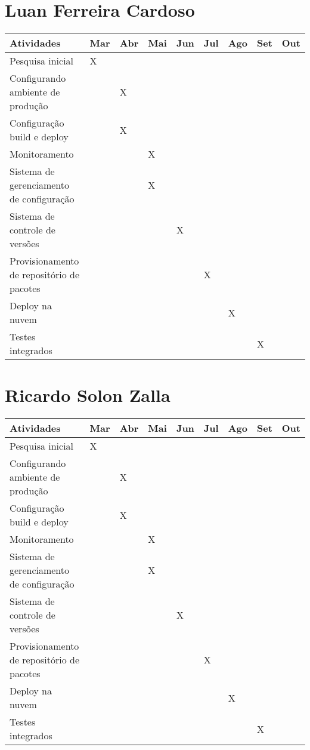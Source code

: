 \section{Luan Ferreira Cardoso}
\begin{center}
\begin{tabular}{ | m{20em} | m{0.5cm}| m{0.5cm} |
m{0.5cm} | m{0.5cm} |
m{0.5cm} |m{0.5cm} |m{0.5cm} |m{0.5cm} | }
\hline
 Atividades & Mar & Abr & Mai & Jun &
 Jul & Ago & Set & Out \\
\hline
Pesquisa inicial & X & & & & & & &  \\
\hline
Configurando ambiente de produção &  & X & & & & & & \\
\hline
Configuração build e deploy &  & X & & & & & & \\
\hline
Monitoramento &  & & X & & & & & \\
\hline
Sistema de gerenciamento de configuração &  & & X & & & & & \\
\hline
Sistema de controle de versões &  & & & X & & & & \\
\hline
Provisionamento de repositório de pacotes &  & & & & X & & & \\
\hline
Deploy na nuvem &  & & & & & X & & \\
\hline
Testes integrados & & & & & & & X & \\


\hline
\end{tabular}
\end{center}

\section{Ricardo Solon Zalla}
\begin{center}
\begin{tabular}{ | m{20em} | m{0.5cm}| m{0.5cm} |
m{0.5cm} | m{0.5cm} |
m{0.5cm} |m{0.5cm} |m{0.5cm} |m{0.5cm} | }
\hline
 Atividades & Mar & Abr & Mai & Jun &
 Jul & Ago & Set & Out \\
\hline
Pesquisa inicial & X & & & & & & &  \\
\hline
Configurando ambiente de produção &  & X & & & & & & \\
\hline
Configuração build e deploy &  & X & & & & & & \\
\hline
Monitoramento &  & & X & & & & & \\
\hline
Sistema de gerenciamento de configuração &  & & X & & & & & \\
\hline
Sistema de controle de versões &  & & & X & & & & \\
\hline
Provisionamento de repositório de pacotes &  & & & & X & & & \\
\hline
Deploy na nuvem &  & & & & & X & & \\
\hline
Testes integrados & & & & & & & X & \\ 

\hline
\end{tabular}
\end{center}
